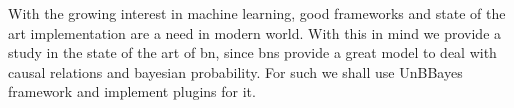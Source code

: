  With the growing interest in machine learning, good frameworks and state of the art implementation are a need in modern world. With this in mind we provide a study in the state of the art of \gls{bn}, since \glspl{bn} provide a great model to deal with causal relations and bayesian probability. For such we shall use UnBBayes framework and implement plugins for it.
  